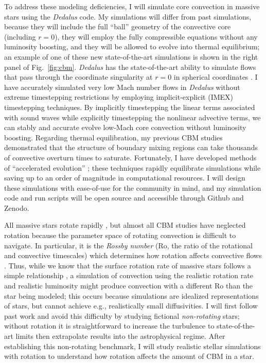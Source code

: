 \documentclass[11pt]{amsart} %
\theoremstyle{definition}
\numberwithin{equation}{section}
\begin{document}
To address these modeling deficiencies, I will simulate core convection in massive stars using the \emph{Dedalus} \citep{burns_etal_2020} code.
My simulations will differ from past simulations, because they will include the full ``ball'' geometry of the convective core (including $r = 0$), they will employ the fully compressible equations without any luminosity boosting, and they will be allowed to evolve into thermal equilibrium; an example of one of these new state-of-the-art simulations is shown in the right panel of Fig.~\ref{fig:cbm}.
\emph{Dedalus} has the state-of-the-art ability to simulate flows that pass through the coordinate singularity at $r = 0$ in spherical coordinates \citep{vasil_etal_2019,lecoanet_etal_2019}.
I have accurately simulated very low Mach number flows in \emph{Dedalus} \citep{anders_brown_2017} without extreme timestepping restrictions by employing implicit-explicit (IMEX) timestepping techniques.
By implicitly timestepping the linear terms associated with sound waves while explicitly timestepping the nonlinear advective terms, we can stably and accurate evolve low-Mach core convection without luminosity boosting.
Regarding thermal equilibration, my previous CBM studies \citep{anders_etal_2022a,anders_etal_2022b} demonstrated that the structure of boundary mixing regions can take thousands of convective overturn times to saturate.
Fortunately, I have developed methods of ``accelerated evolution'' \citep{anders_etal_2018,anders_etal_2020}; these techniques rapidly equilibrate simulations while saving up to an order of magnitude in computational resources.
I will design these simulations with ease-of-use for the community in mind, and my simulation code and run scripts will be open source and accessible through Github and Zenodo.

All massive stars rotate rapidly \citep{jermyn_etal_2022_atlas}, but almost all CBM studies have neglected rotation because the parameter space of rotating convection is difficult to navigate.
In particular, it is the \emph{Rossby number} (Ro, the ratio of the rotational and convective timescales) which determines how rotation affects convective flows \citep{aurnou_etal_2020}.
Thus, while we know that the surface rotation rate of massive stars follows a simple relationship \citep{glebocki_gnacinski_2005,ramirezagudelo_etal_2013,nielsen_etal_2013}, a simulation of convection using the realistic rotation rate and realistic luminosity might produce convection with a different Ro than the star being modeled; this occurs because simulations are idealized representations of stars, but cannot achieve e.g., realistically small diffusivities.
I will first follow past work and avoid this difficulty by studying fictional \emph{non-rotating} stars; without rotation it is straightforward to increase the turbulence to state-of-the-art limits then extrapolate results into the astrophysical regime.
After establishing this non-rotating benchmark, I will study realistic stellar simulations with rotation to understand how rotation affects the amount of CBM in a star.
\end{document}
